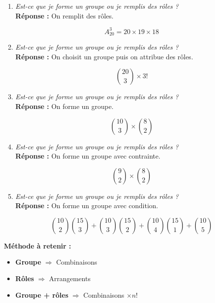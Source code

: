 \documentclass[12pt]{article}
\begin{document}
\begin{enumerate}[label=\textbf{Exercice \arabic*.}]
\[
\binom{20}{5}
\]

\vspace{0.3cm}

\item \textit{Est-ce que je forme un groupe ou je remplis des rôles ?}\\
\textbf{Réponse :} On remplit des rôles.

\[
A_{20}^3 = 20 \times 19 \times 18
\]

\vspace{0.3cm}

\item \textit{Est-ce que je forme un groupe ou je remplis des rôles ?}\\
\textbf{Réponse :} On choisit un groupe puis on attribue des rôles.

\[
\binom{20}{3} \times 3!
\]

\vspace{0.3cm}

\item \textit{Est-ce que je forme un groupe ou je remplis des rôles ?}\\
\textbf{Réponse :} On forme un groupe.

\[
\binom{10}{3} \times \binom{8}{2}
\]

\vspace{0.3cm}

\item \textit{Est-ce que je forme un groupe ou je remplis des rôles ?}\\
\textbf{Réponse :} On forme un groupe avec contrainte.

\[
\binom{9}{2} \times \binom{8}{2}
\]

\vspace{0.3cm}

\item \textit{Est-ce que je forme un groupe ou je remplis des rôles ?}\\
\textbf{Réponse :} On forme un groupe avec condition.

\[
\binom{10}{2}\binom{15}{3}
+ \binom{10}{3}\binom{15}{2}
+ \binom{10}{4}\binom{15}{1}
+ \binom{10}{5}
\]

\end{enumerate}

\vspace{0.5cm}

\textbf{Méthode à retenir :}

\begin{itemize}
    \item \textbf{Groupe} $\Rightarrow$ Combinaisons
    \item \textbf{Rôles} $\Rightarrow$ Arrangements
    \item \textbf{Groupe + rôles} $\Rightarrow$ Combinaisons $\times n!$
\end{itemize}
\end{document}
